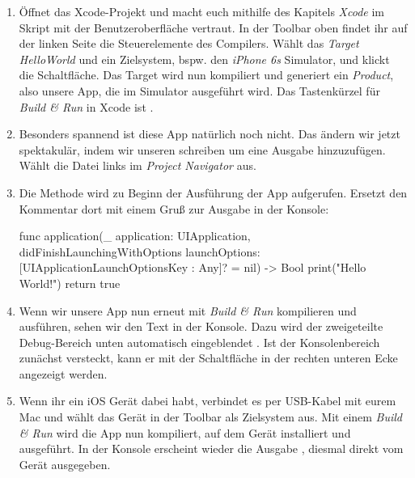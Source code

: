 \documentclass[parskip=half, final]{scrreprt}
\begin{document}
\begin{lecture}
\begin{enumerate}
\item Öffnet das Xcode-Projekt  und macht euch mithilfe des Kapitels \emph{Xcode} im Skript mit der Benutzeroberfläche vertraut. In der Toolbar oben findet ihr auf der linken Seite die Steuerelemente des Compilers. Wählt das \emph{Target} \emph{HelloWorld} und ein Zielsystem, bspw. den \emph{iPhone 6s} Simulator, und klickt die  Schaltfläche. Das Target wird nun kompiliert und generiert ein \emph{Product}, also unsere App, die im Simulator ausgeführt wird. Das Tastenkürzel für \emph{Build \& Run} in Xcode ist .

\item Besonders spannend ist diese App natürlich noch nicht. Das ändern wir jetzt spektakulär, indem wir unseren  schreiben um eine Ausgabe hinzuzufügen. Wählt die Datei  links im \emph{Project Navigator} aus.

\item Die Methode  wird zu Beginn der Ausführung der App aufgerufen. Ersetzt den Kommentar dort mit einem Gruß zur Ausgabe in der Konsole:

\begin{swiftcode}
func application(_ application: UIApplication, didFinishLaunchingWithOptions launchOptions: [UIApplicationLaunchOptionsKey : Any]? = nil) -> Bool {
    print("Hello World!")
    return true
}
\end{swiftcode}

\item Wenn wir unsere App nun erneut mit \emph{Build \& Run}  kompilieren und ausführen, sehen wir den Text  in der Konsole. Dazu wird der zweigeteilte Debug-Bereich unten automatisch eingeblendet . Ist der Konsolenbereich zunächst versteckt, kann er mit der Schaltfläche in der rechten unteren Ecke angezeigt werden.


\item Wenn ihr ein iOS Gerät dabei habt, verbindet es per USB-Kabel mit eurem Mac und wählt das Gerät in der Toolbar als Zielsystem aus. Mit einem \emph{Build \& Run} wird die App nun kompiliert, auf dem Gerät installiert und ausgeführt. In der Konsole erscheint wieder die Ausgabe , diesmal direkt vom Gerät ausgegeben.


\end{enumerate}
\end{lecture}
\end{document}
